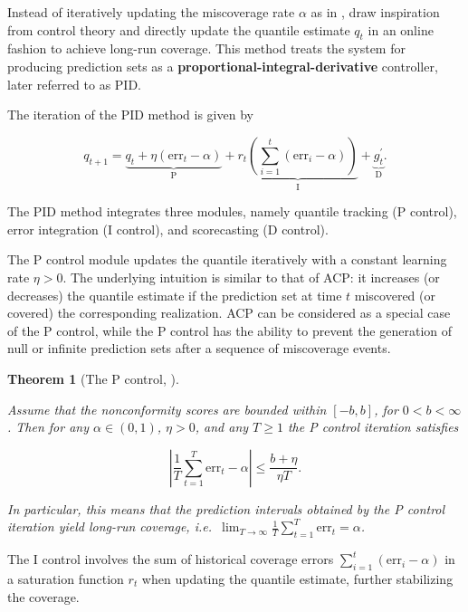 \documentclass[
  11pt,
  a4paper,
]{article}
\theoremstyle{plain}
\newtheorem{theorem}{Theorem}[section]
\theoremstyle{plain}
\theoremstyle{remark}
\begin{document}
Instead of iteratively updating the miscoverage rate \(\alpha\) as in
\textcite{gibbs2021}, \textcite{angelopoulos2024} draw inspiration from
control theory and directly update the quantile estimate \(q_t\) in an
online fashion to achieve long-run coverage. This method treats the
system for producing prediction sets as a
\textbf{proportional-integral-derivative} controller, later referred to
as PID.

The iteration of the PID method is given by

\[
q_{t+1}=\underbrace{q_t+\eta \left(\mathrm{err}_t-\alpha\right)}_{\mathrm{P}}+\underbrace{r_t\left(\sum_{i=1}^t \left(\mathrm{err}_i-\alpha\right)\right)}_{\mathrm{I}}+\underbrace{g_t^{\prime}}_{\mathrm{D}}.
\]

The PID method integrates three modules, namely quantile tracking (P
control), error integration (I control), and scorecasting (D control).

The P control module updates the quantile iteratively with a constant
learning rate \(\eta > 0\). The underlying intuition is similar to that
of ACP: it increases (or decreases) the quantile estimate if the
prediction set at time \(t\) miscovered (or covered) the corresponding
realization. ACP can be considered as a special case of the P control,
while the P control has the ability to prevent the generation of null or
infinite prediction sets after a sequence of miscoverage events.

\begin{theorem}[The P control,
\textcite{angelopoulos2024}]\protect\hypertarget{thm-pid_p}{}\label{thm-pid_p}

Assume that the nonconformity scores are bounded within \([-b, b]\), for
\(0<b<\infty\). Then for any \(\alpha \in (0,1)\), \(\eta > 0\), and any
\(T \geq 1\) the P control iteration satisfies

\[
|\frac{1}{T}\sum_{t=1}^{T}\mathrm{err}_t - \alpha| \leq \frac{b+\eta}{\eta T}.
\]

In particular, this means that the prediction intervals obtained by the
P control iteration yield long-run coverage,
i.e.~\(\lim _{T \rightarrow \infty} \frac{1}{T} \sum_{t=1}^T \mathrm{err}_t = \alpha\).

\end{theorem}

The I control involves the sum of historical coverage errors
\(\sum_{i=1}^t (\mathrm{err}_i-\alpha)\) in a saturation function
\(r_t\) when updating the quantile estimate, further stabilizing the
coverage.
\end{document}
